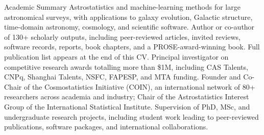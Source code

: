 \begin{rubric}{Academic Summary}
 Astrostatistics and machine-learning methods for large astronomical surveys, with applications to galaxy evolution, Galactic structure, time-domain astronomy, cosmology, and scientific software.
%
\entry*[Publications] Author or co-author of 130+ scholarly outputs, including peer-reviewed articles, invited reviews, software records, reports, book chapters, and a PROSE-award-winning book. Full publication list appears at the end of this CV.
%
 Principal investigator on competitive research awards totalling more than \$1M, including CAS Talents, CNPq, Shanghai Talents, NSFC, FAPESP, and MTA funding.
%
\entry*[Leadership] Founder and Co-Chair of the Cosmostatistics Initiative (COIN), an international network of 80+ researchers across academia and industry; Chair of the Astrostatistics Interest Group of the International Statistical Institute.
%
\entry*[Mentoring] Supervision of PhD, MSc, and undergraduate research projects, including student work leading to peer-reviewed publications, software packages, and international collaborations.
\end{rubric}
